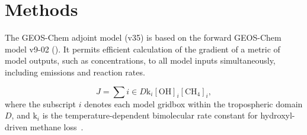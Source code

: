 \section{Methods}

The GEOS-Chem adjoint model\cite{ref:henze2007} (v35) is based on the forward GEOS-Chem model v9-02 (\href{http://www.geos-chem.org}{}). It permits efficient calculation of the gradient of a metric of model outputs, such as concentrations, to all model inputs simultaneously, including emissions and reaction rates\cite{ref:walker2015}.

\begin{equation}
J=\sum{i \in D} \mathrm{k}_i \mathrm{[OH]}_i \mathrm{[CH_4]}_i,
\end{equation}
where the subscript $i$ denotes each model gridbox within the tropospheric domain $D$, and $\mathrm{k}_i$ is the temperature-dependent bimolecular rate constant for hydroxyl-driven methane loss~\citep{ref:sander2011}.
